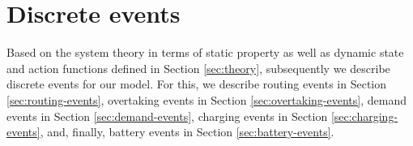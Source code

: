 \documentclass[graybox]{svmult}
\begin{document}


\vspace{-2mm}

\section{Discrete events}
\label{sec:events}
Based on the system theory in terms of static property as well as dynamic state and action functions defined in Section \ref{sec:theory}, subsequently we describe discrete events for our model. For this, we describe routing events in Section \ref{sec:routing-events}, overtaking events in Section \ref{sec:overtaking-events}, demand events in Section \ref{sec:demand-events}, charging events in Section \ref{sec:charging-events}, and, finally, battery events in Section \ref{sec:battery-events}.
\vspace{-2mm}
\end{document}
